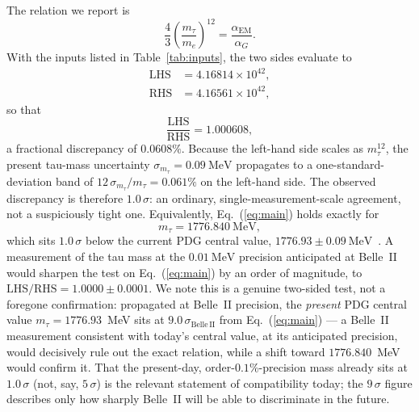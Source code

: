 \documentclass[aps,prd,twocolumn,amsmath,amssymb,floatfix,nofootinbib]{revtex4-2}
\begin{document}
The relation we report is
\begin{equation}
\frac{4}{3}\left(\frac{m_\tau}{m_e}\right)^{\!12}
= \frac{\alpha_{\mathrm{EM}}}{\alpha_G}.
\label{eq:main}
\end{equation}
With the inputs listed in Table~\ref{tab:inputs}, the two sides evaluate to
\begin{align}
\text{LHS} &= 4.16814\times 10^{42}, \nonumber\\
\text{RHS} &= 4.16561\times 10^{42},
\end{align}
so that
\begin{equation}
\frac{\text{LHS}}{\text{RHS}} = 1.000608,
\end{equation}
a fractional discrepancy of $0.0608\%$. Because the left-hand side scales as
$m_\tau^{12}$, the present tau-mass uncertainty
$\sigma_{m_\tau}=0.09~\mathrm{MeV}$ propagates to a one-standard-deviation band
of $12\,\sigma_{m_\tau}/m_\tau = 0.061\%$ on the left-hand side. The observed
discrepancy is therefore $1.0\,\sigma$: an ordinary, single-measurement-scale
agreement, not a suspiciously tight one. Equivalently, Eq.~(\ref{eq:main})
holds exactly for
\begin{equation}
m_\tau = 1776.840~\mathrm{MeV},
\end{equation}
which sits $1.0\,\sigma$ below the current PDG central value,
$1776.93\pm 0.09~\mathrm{MeV}$~\cite{pdg2024}. A measurement of the tau mass at
the $0.01~\mathrm{MeV}$ precision anticipated at Belle~II~\cite{belleii} would
sharpen the test on Eq.~(\ref{eq:main}) by an order of magnitude, to
$\mathrm{LHS/RHS} = 1.0000 \pm 0.0001$. We note this is a genuine two-sided
test, not a foregone confirmation: propagated at Belle~II precision, the
\emph{present} PDG central value $m_\tau=1776.93$~MeV sits at
$9.0\,\sigma_{\mathrm{Belle\,II}}$ from Eq.~(\ref{eq:main}) --- a Belle~II
measurement consistent with today's central value, at its anticipated
precision, would decisively rule out the exact relation, while a shift toward
$1776.840$~MeV would confirm it. That the present-day, order-$0.1\%$-precision
mass already sits at $1.0\,\sigma$ (not, say, $5\,\sigma$) is the relevant
statement of compatibility today; the $9\,\sigma$ figure describes only how
sharply Belle~II will be able to discriminate in the future.
\end{document}
